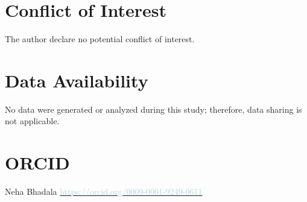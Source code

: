 \documentclass[preprint,11pt,3p]{elsarticle}
\begin{document}
\section*{Conflict of Interest}
The author declare no potential conflict of interest.

\section*{Data Availability}
No data were generated or analyzed during this study; therefore, data sharing is not applicable.

\section*{ORCID}
Neha Bhadala \orcidC \href{https://orcid.org/0009-0001-9249-0611}{ \hspace{2mm}\textcolor{lightblue}{https://orcid.org/0009-0001-9249-0611}} \\




\end{document}
